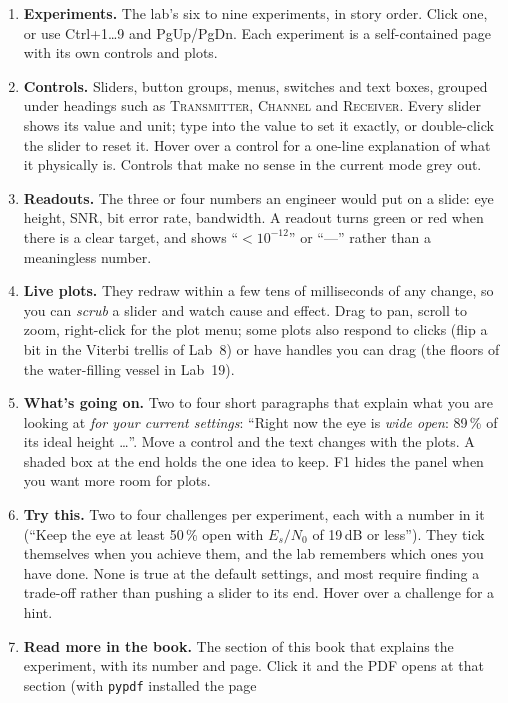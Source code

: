 \begin{enumerate}[leftmargin=1.6em,itemsep=3pt,label=\textbf{\arabic*}]
\item \textbf{Experiments.} The lab's six to nine experiments, in story order. Click one, or use
Ctrl+1\ldots9 and PgUp/PgDn. Each experiment is a self-contained page with its own controls and
plots.
\item \textbf{Controls.} Sliders, button groups, menus, switches and text boxes, grouped under
headings such as \textsc{Transmitter}, \textsc{Channel} and \textsc{Receiver}. Every slider shows
its value and unit; type into the value to set it exactly, or double-click the slider to reset it.
Hover over a control for a one-line explanation of what it physically is. Controls that make no
sense in the current mode grey out.
\item \textbf{Readouts.} The three or four numbers an engineer would put on a slide: eye height, SNR,
bit error rate, bandwidth. A readout turns green or red when there is a clear target, and shows
``$<10^{-12}$'' or ``---'' rather than a meaningless number.
\item \textbf{Live plots.} They redraw within a few tens of milliseconds of any change, so you can
\emph{scrub} a slider and watch cause and effect. Drag to pan, scroll to zoom, right-click for the
plot menu; some plots also respond to clicks (flip a bit in the Viterbi trellis of Lab~8) or have
handles you can drag (the floors of the water-filling vessel in Lab~19).
\item \textbf{What's going on.} Two to four short paragraphs that explain what you are looking at
\emph{for your current settings}: ``Right now the eye is \emph{wide open}: 89\,\% of its ideal height
\ldots''. Move a control and the text changes with the plots. A shaded box at the end holds the one
idea to keep. F1 hides the panel when you want more room for plots.
\item \textbf{Try this.} Two to four challenges per experiment, each with a number in it (``Keep
the eye at least 50\,\% open with $E_s/N_0$ of 19\,dB or less''). They tick themselves when you
achieve them, and the lab remembers which ones you have done. None is true at the default
settings, and most require finding a trade-off rather than pushing a slider to its end. Hover over
a challenge for a hint.
\item \textbf{Read more in the book.} The section of this book that explains the experiment, with its
number and page. Click it and the PDF opens at that section (with \texttt{pypdf} installed the page

\end{enumerate}
